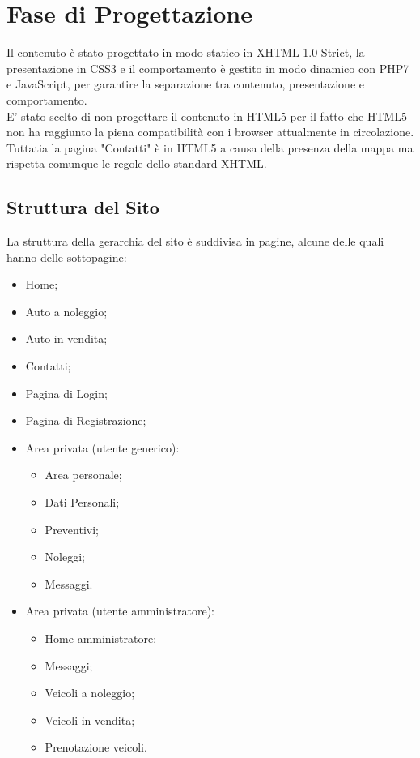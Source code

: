 \section{Fase di Progettazione}
    Il contenuto è stato progettato in modo statico in XHTML 1.0 Strict, la presentazione in CSS3 e il comportamento è gestito in modo dinamico con PHP7 e JavaScript, per garantire la separazione tra contenuto, presentazione e comportamento. \\
    E’ stato scelto di non progettare il contenuto in HTML5 per il fatto che HTML5 non ha raggiunto la piena compatibilità con i browser attualmente in circolazione. Tuttatia la pagina "Contatti" è in HTML5 a causa della presenza della mappa ma rispetta comunque le regole dello standard XHTML.
    \subsection{Struttura del Sito}
        
    La struttura della gerarchia del sito è suddivisa in pagine, alcune delle quali hanno delle sottopagine:
    \begin{itemize}
        \item Home;
        \item Auto a noleggio;
        \item Auto in vendita;
        \item Contatti;
        \item Pagina di Login;
        \item Pagina di Registrazione;
        \item Area privata (utente generico):
            \begin{itemize}
                \item Area personale;
                \item Dati Personali;
                \item Preventivi;
                \item Noleggi;
                \item Messaggi.
            \end{itemize}
            \item Area privata (utente amministratore):
                \begin{itemize}
                    \item Home amministratore;
                    \item Messaggi;
                    \item Veicoli a noleggio;
                    \item Veicoli in vendita;
                    \item Prenotazione veicoli.
                \end{itemize}
    \end{itemize}

